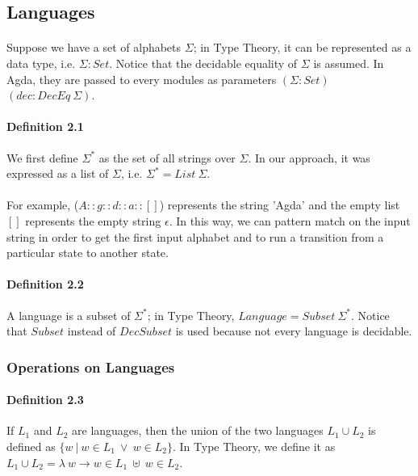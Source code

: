 \documentclass[twoside,openright,final]{bhamthesis}
\begin{document}
\subsection{Languages}

\paragraph{} Suppose we have a set of alphabets \(\Sigma\); in Type Theory, it
can be represented as a data type, i.e. \(\Sigma : Set\). Notice that the decidable equality of
\(\Sigma\) is assumed. In Agda, they are passed to every modules as
parameters \((\Sigma : Set)\) \((dec : DecEq\ \Sigma)\). 

\paragraph{Definition 2.1} We first define \(\Sigma^*\) as the set of all
strings over \(\Sigma\). In our approach, it was expressed as a list of
\(\Sigma\), i.e. \(\Sigma^* = List\ \Sigma\). 

\paragraph{} For example, (\(A :: g ::
d :: a :: []\)) represents the string 'Agda' and the empty list \([]\)
represents the empty string \(\epsilon\). In this way, we can pattern
match on the input string in order to get the first
input alphabet and to run a transition from a particular state to another state. 

\paragraph{Definition 2.2} A language is a subset of 
\(\Sigma^*\); in Type Theory, \(Language = Subset\ \Sigma^*\). 
Notice that \(Subset\) instead of \(DecSubset\) is used because not every language is decidable. 

\subsubsection{Operations on Languages}

\paragraph{Definition 2.3} If \(L_1\) and \(L_2\) are languages, then
the union of the two languages \(L_1\cup L_2\) is defined as \(\{w\
|\  w \in L_1\ \vee \ w \in
L_2\}\). In Type Theory, we define it as \(L_1 \cup L_2 = \lambda\ w
\to w \in L_1\ \uplus\ w \in L_2\).
\end{document}
